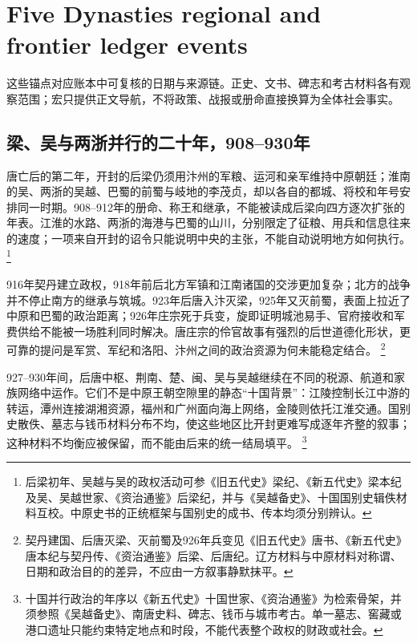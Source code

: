 \section{Five Dynasties regional and frontier ledger events}
\label{sec:five-dynasties-ten-kingdoms-event-anchors-batch-two}
这些锚点对应账本中可复核的日期与来源链。正史、文书、碑志和考古材料各有观察范围；宏只提供正文导航，不将政策、战报或册命直接换算为全体社会事实。

\subsection{梁、吴与两浙并行的二十年，908--930年}

唐亡后的第二年，开封的后梁仍须用汴州的军粮、运河和亲军维持中原朝廷；淮南的吴、两浙的吴越、巴蜀的前蜀与岐地的李茂贞，却以各自的都城、将校和年号安排同一时期。908--912年的册命、称王和继承，不能被读成后梁向四方逐次扩张的年表。江淮的水路、两浙的海港与巴蜀的山川，分别限定了征粮、用兵和信息往来的速度；一项来自开封的诏令只能说明中央的主张，不能自动说明地方如何执行。%
\footnote{后梁初年、吴越与吴的政权活动可参《旧五代史》梁纪、《新五代史》梁本纪及吴、吴越世家、《资治通鉴》后梁纪，并与《吴越备史》、十国国别史辑佚材料互校。中原史书的正统框架与国别史的成书、传本均须分别辨认。}

916年契丹建立政权，918年前后北方军镇和江南诸国的交涉更加复杂；北方的战争并不停止南方的继承与筑城。923年后唐入汴灭梁，925年又灭前蜀，表面上拉近了中原和巴蜀的政治距离；926年庄宗死于兵变，旋即证明城池易手、官府接收和军费供给不能被一场胜利同时解决。唐庄宗的伶官故事有强烈的后世道德化形状，更可靠的提问是军赏、军纪和洛阳、汴州之间的政治资源为何未能稳定结合。%
\footnote{契丹建国、后唐灭梁、灭前蜀及926年兵变见《旧五代史》唐书、《新五代史》唐本纪与契丹传、《资治通鉴》后梁、后唐纪。辽方材料与中原材料对称谓、日期和政治目的的差异，不应由一方叙事静默抹平。}

927--930年间，后唐中枢、荆南、楚、闽、吴与吴越继续在不同的税源、航道和家族网络中运作。它们不是中原王朝空隙里的静态“十国背景”：江陵控制长江中游的转运，潭州连接湖湘资源，福州和广州面向海上网络，金陵则依托江淮交通。国别史散佚、墓志与钱币材料分布不均，使这些地区比开封更难写成逐年齐整的叙事；这种材料不均衡应被保留，而不能由后来的统一结局填平。%
\footnote{十国并行政治的年序以《新五代史》十国世家、《资治通鉴》为检索骨架，并须参照《吴越备史》、南唐史料、碑志、钱币与城市考古。单一墓志、窖藏或港口遗址只能约束特定地点和时段，不能代表整个政权的财政或社会。}

